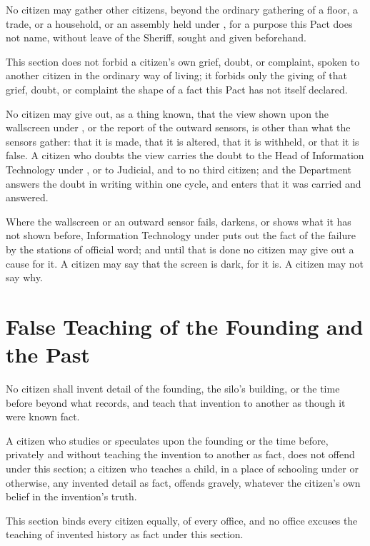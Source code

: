 \begin{clauses}
\item No citizen may gather other citizens, beyond the ordinary gathering of a floor, a trade, or a household, or an assembly held under , for a purpose this Pact does not name, without leave of the Sheriff, sought and given beforehand.
\item This section does not forbid a citizen's own grief, doubt, or complaint, spoken to another citizen in the ordinary way of living; it forbids only the giving of that grief, doubt, or complaint the shape of a fact this Pact has not itself declared.
\item No citizen may give out, as a thing known, that the view shown upon the wallscreen under , or the report of the outward sensors, is other than what the sensors gather: that it is made, that it is altered, that it is withheld, or that it is false. A citizen who doubts the view carries the doubt to the Head of Information Technology under , or to Judicial, and to no third citizen; and the Department answers the doubt in writing within one cycle, and enters that it was carried and answered.
\item Where the wallscreen or an outward sensor fails, darkens, or shows what it has not shown before, Information Technology under  puts out the fact of the failure by the stations of official word; and until that is done no citizen may give out a cause for it. A citizen may say that the screen is dark, for it is. A citizen may not say why.
\end{clauses}

\section{False Teaching of the Founding and the Past}
\label{sec:publicorder:false-teaching-of-the-founding-and-the-past}

No citizen shall invent detail of the founding, the silo's building, or the time before beyond what  records, and teach that invention to another as though it were known fact.

\begin{clauses}
\item A citizen who studies or speculates upon the founding or the time before, privately and without teaching the invention to another as fact, does not offend under this section; a citizen who teaches a child, in a place of schooling under  or otherwise, any invented detail as fact, offends gravely, whatever the citizen's own belief in the invention's truth.
\item This section binds every citizen equally, of every office, and no office excuses the teaching of invented history as fact under this section.
\end{clauses}

